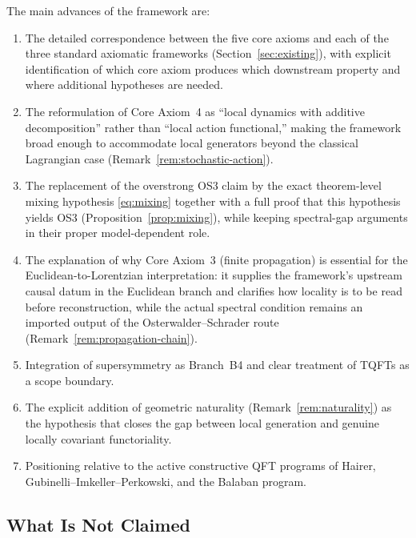 \documentclass[12pt,a4paper]{article}
\theoremstyle{plain}
\theoremstyle{definition}
\theoremstyle{remark}
\begin{document}
The main advances of the framework are:

\begin{enumerate}[nosep]
\item The detailed correspondence between the five core axioms and
  each of the three standard axiomatic frameworks (Section~\ref{sec:existing}),
  with explicit identification of which core axiom produces which
  downstream property and where additional hypotheses are needed.

\item The reformulation of Core Axiom~4 as ``local dynamics with
  additive decomposition'' rather than ``local action functional,''
  making the framework broad enough to accommodate local generators
  beyond the classical Lagrangian case
  (Remark~\ref{rem:stochastic-action}).

\item The replacement of the overstrong OS3 claim by the exact
  theorem-level mixing hypothesis \eqref{eq:mixing} together with a
  full proof that this hypothesis yields OS3
  (Proposition~\ref{prop:mixing}), while keeping spectral-gap
  arguments in their proper model-dependent role.

\item The explanation of why Core Axiom~3 (finite propagation) is
  essential for the Euclidean-to-Lorentzian interpretation: it
  supplies the framework's upstream causal datum in the Euclidean
  branch and clarifies how locality is to be read before
  reconstruction, while the actual spectral condition remains an
  imported output of the Osterwalder--Schrader route
  (Remark~\ref{rem:propagation-chain}).

\item Integration of supersymmetry as Branch~B4 and clear treatment of
  TQFTs as a scope boundary.

\item The explicit addition of geometric naturality
  (Remark~\ref{rem:naturality}) as the hypothesis that closes the gap
  between local generation and genuine locally covariant functoriality.

\item Positioning relative to the active constructive QFT programs of
  Hairer, Gubinelli--Imkeller--Perkowski, and the Balaban program.
\end{enumerate}


\subsection{What Is Not Claimed}
\end{document}
